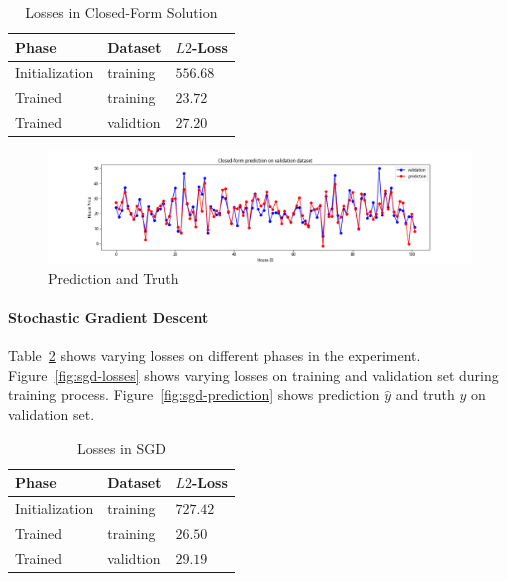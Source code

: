 \documentclass[journal, a4paper]{IEEEtran}
\begin{document}
    \begin{table}[!hbt]
        \begin{center}
        \caption{Losses in Closed-Form Solution}
        \label{tab:closed-form-losses}
        \begin{tabular}{l|l|l}
            \hline
            Phase & Dataset & $L2$-Loss \\
            \hline
            Initialization & training & $556.68$ \\
            Trained & training & $23.72$ \\
            Trained & validtion & $27.20$ \\
            \hline
        \end{tabular}
        \end{center}
    \end{table}    
    
    \begin{figure}[!hbt]
        \begin{center}
        \caption{Prediction and Truth}
        \label{fig:closed-form-prediction}
        \includegraphics[width=\columnwidth]{../images/closed-form-prediction.png}
        \end{center}
    \end{figure}
    
\paragraph{Stochastic Gradient Descent}
    Table~\ref{tab:sgd-losses} shows varying losses on different phases in the experiment. Figure~\ref{fig:sgd-losses} shows varying losses on training and validation set during training process. Figure~\ref{fig:sgd-prediction} shows prediction $\hat{y}$ and truth $y$ on validation set.
    
    \begin{table}[!hbt]
        \begin{center}
        \caption{Losses in SGD}
        \label{tab:sgd-losses}
        \begin{tabular}{l|l|l}
            \hline
            Phase & Dataset & $L2$-Loss \\
            \hline
            Initialization & training & $727.42$ \\
            Trained & training & $26.50$ \\
            Trained & validtion & $29.19$ \\
            \hline
        \end{tabular}
        \end{center}
    \end{table}
    
\end{document}
